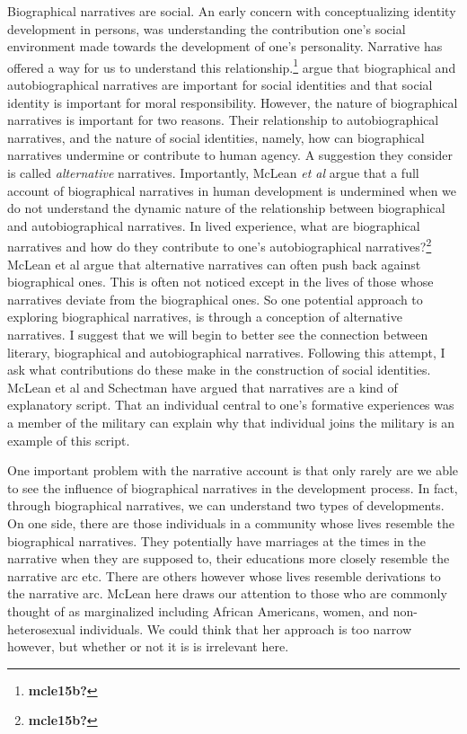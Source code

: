 \documentclass[
  12pt,
]{book}
\theoremstyle{definition}
\theoremstyle{definition}
\theoremstyle{definition}
\theoremstyle{definition}
\theoremstyle{remark}
\begin{document}
Biographical narratives are social. An early concern with conceptualizing identity development in persons, was understanding the contribution one's social environment made towards the development of one's personality. Narrative has offered a way for us to understand this relationship.\footnote{\textbf{mcle15b?}} argue that biographical and autobiographical narratives are important for social identities and that social identity is important for moral responsibility. However, the nature of biographical narratives is important for two reasons. Their relationship to autobiographical narratives, and the nature of social identities, namely, how can biographical narratives undermine or contribute to human agency. A suggestion they consider is called \emph{alternative} narratives. Importantly, McLean \emph{et al} argue that a full account of biographical narratives in human development is undermined when we do not understand the dynamic nature of the relationship between biographical and autobiographical narratives. In lived experience, what are biographical narratives and how do they contribute to one's autobiographical narratives?\footnote{\textbf{mcle15b?}} McLean et al argue that alternative narratives can often push back against biographical ones. This is often not noticed except in the lives of those whose narratives deviate from the biographical ones. So one potential approach to exploring biographical narratives, is through a conception of alternative narratives. I suggest that we will begin to better see the connection between literary, biographical and autobiographical narratives. Following this attempt, I ask what contributions do these make in the construction of social identities. McLean et al and Schectman have argued that narratives are a kind of explanatory script. That an individual central to one's formative experiences was a member of the military can explain why that individual joins the military is an example of this script.

One important problem with the narrative account is that only rarely are we able to see the influence of biographical narratives in the development process. In fact, through biographical narratives, we can understand two types of developments. On one side, there are those individuals in a community whose lives resemble the biographical narratives. They potentially have marriages at the times in the narrative when they are supposed to, their educations more closely resemble the narrative arc etc. There are others however whose lives resemble derivations to the narrative arc. McLean here draws our attention to those who are commonly thought of as marginalized including African Americans, women, and non-heterosexual individuals. We could think that her approach is too narrow however, but whether or not it is is irrelevant here.
\end{document}
